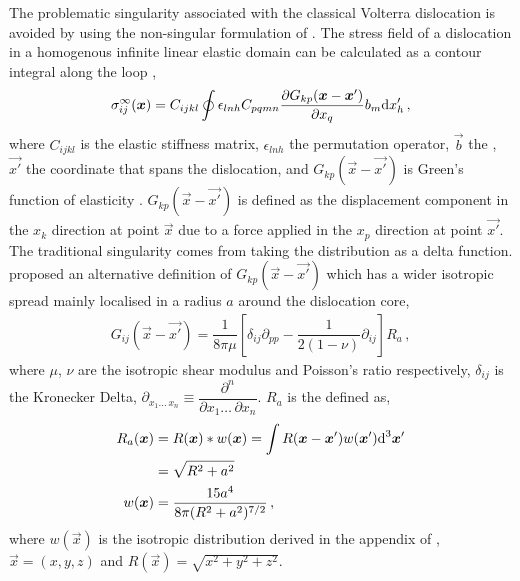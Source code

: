 The problematic singularity associated with the classical Volterra dislocation is avoided by using the non-singular formulation of \citet{a_non-singular_continuum_theory_of_dislocations}. The stress field of a dislocation in a homogenous infinite linear elastic domain can be calculated as a contour integral along the loop \cite{mura_t},
\begin{align}\label{eq:field_stress}
	\sigma_{ij}^{\infty}(\vec{x}) = C_{ijkl} \oint \epsilon_{lnh} C_{pqmn} \dfrac{\partial G_{kp}(\vec{x} - \vec{x'})}{\partial x_{q}} b_{m} \rvar{d}x'_{h}\,,
\end{align}
where $ C_{ijkl} $ is the elastic stiffness matrix, $ \epsilon_{lnh} $ the permutation operator, $\vec{b}$ the , $ \vec{x'} $ the coordinate that spans the dislocation, and $ G_{kp}(\vec{x} - \vec{x'}) $ is Green's function of elasticity \cite{mura_t}. $ G_{kp}(\vec{x} - \vec{x'}) $ is defined as the displacement component in the $ x_{k} $ direction at point $ \vec{x} $ due to a force applied in the $ x_{p} $ direction at point $ \vec{x'} $. The traditional singularity comes from taking the  distribution as a delta function. \citet{a_non-singular_continuum_theory_of_dislocations} proposed an alternative definition of $ G_{kp}(\vec{x} - \vec{x'}) $ which has a wider isotropic spread mainly localised in a radius $ a $ around the dislocation core,
\begin{align}\label{eq:elastic_green_func}
	G_{ij}(\vec{x} - \vec{x'}) = \dfrac{1}{8\pi \mu}\left[ \delta_{ij} \partial_{pp} - \dfrac{1}{2(1-\nu)} \partial_{ij} \right] R_{a}\,,
\end{align}
where $ \mu $, $ \nu $ are the isotropic shear modulus and Poisson's ratio respectively, $ \delta_{ij} $ is the Kronecker Delta, $ \partial_{x_{1} \ldots\, x_{n}} \equiv \dfrac{\partial^{n}}{\partial x_{1} \ldots\, \partial x_{n}}$. $ R_{a} $ is the defined as,
\begin{subequations}
	\begin{align}\label{eq:ra}
		R_{a}(\vec{x}) & = R(\vec{x}) * w(\vec{x}) = \int R(\vec{x} - \vec{x'}) w(\vec{x'}) \rvar{d}^{3}\vec{x'}\nn
		               & = \sqrt{R^{2} + a^{2}}                                                                     \\
		w(\vec{x})     & = \dfrac{15 a^{4}}{8\pi (R^{2} + a^{2})^{7/2}}\,,
	\end{align}
\end{subequations}
where $ w(\vec{x}) $ is the isotropic  distribution derived in the appendix of \cite{a_non-singular_continuum_theory_of_dislocations}, $ \vec{x} = (x, y, z) $ and $ R(\vec{x}) = \sqrt{x^{2} + y^{2} + z^{2}} $.

